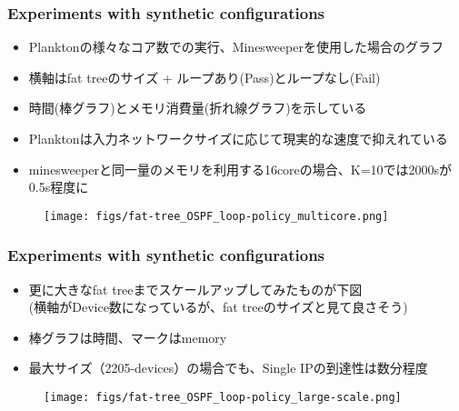 \documentclass[dvipdfmx,9pt,notheorems]{beamer}
\theoremstyle{definition}
\begin{document}
\begin{frame}\frametitle{Experiments with synthetic configurations}
\begin{itemize}
	\item Planktonの様々なコア数での実行、Minesweeperを使用した場合のグラフ
	\item 横軸はfat treeのサイズ + ループあり(Pass)とループなし(Fail)
	\item 時間(棒グラフ)とメモリ消費量(折れ線グラフ)を示している
	\item Planktonは入力ネットワークサイズに応じて現実的な速度で抑えれている
	\item minesweeperと同一量のメモリを利用する16coreの場合、K=10では2000sが0.5s程度に
\end{itemize}
\begin{figure}[htb]
  \centering
	\texttt{[image: figs/fat-tree\_OSPF\_loop-policy\_multicore.png]}
\end{figure}%
\end{frame}

\begin{frame}\frametitle{Experiments with synthetic configurations}
\begin{itemize}
	\item 更に大きなfat treeまでスケールアップしてみたものが下図\\
		(横軸がDevice数になっているが、fat treeのサイズと見て良さそう)
	\item 棒グラフは時間、マークはmemory
	\item 最大サイズ（2205-devices）の場合でも、Single IPの到達性は数分程度
\end{itemize}
\begin{figure}[htb]
  \centering
	\texttt{[image: figs/fat-tree\_OSPF\_loop-policy\_large-scale.png]}
\end{figure}%
\end{frame}
\end{document}
